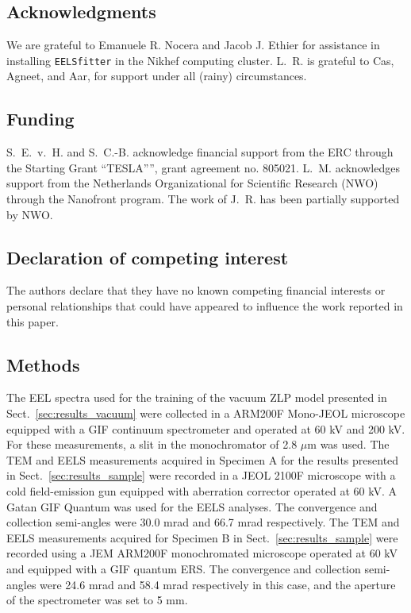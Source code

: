 \subsection*{Acknowledgments}
We are grateful to Emanuele R. Nocera and Jacob J. Ethier for
assistance in installing {\tt EELSfitter} in the Nikhef computing cluster.
%
L.~R. is grateful to Cas, Agneet, and Aar, for support under all 
(rainy) circumstances.


\subsection*{Funding}

S.~E.~v.~H. and S.~C.-B. acknowledge financial support
from the ERC through the Starting Grant ``TESLA”'', grant agreement
no. 805021.
%
L.~M. acknowledges support from the
Netherlands Organizational for Scientific Research (NWO)
through the Nanofront program.
%
The work of J.~R. has been partially supported by NWO.

\subsection*{Declaration of competing interest}

The authors declare that they have no known competing financial interests or personal relationships that could have appeared to influence the work reported in this paper.

\subsection*{Methods}

{\justify
The EEL spectra used for the training of the vacuum ZLP model presented in Sect.~\ref{sec:results_vacuum} were collected in a ARM200F Mono-JEOL microscope equipped with a GIF continuum spectrometer and operated at 60 kV and 200 kV. For these measurements, a slit in the monochromator of 2.8 $\mu$m was used.
%
The TEM and EELS measurements acquired in Specimen A for the results presented in
Sect.~\ref{sec:results_sample} were recorded in a JEOL 2100F microscope with a cold field-emission
gun equipped with aberration corrector operated at 60 kV. A Gatan GIF Quantum was used for
the EELS analyses. The convergence and collection semi-angles were 30.0 mrad and 66.7 mrad respectively.
%
The TEM and EELS measurements acquired for Specimen B in Sect.~\ref{sec:results_sample}
were recorded using a JEM ARM200F monochromated microscope operated at 60 kV and equipped with
a GIF quantum ERS. The convergence and collection semi-angles were 24.6 mrad and 58.4 mrad respectively
in this case, and the aperture of the spectrometer was set to 5 mm.}

